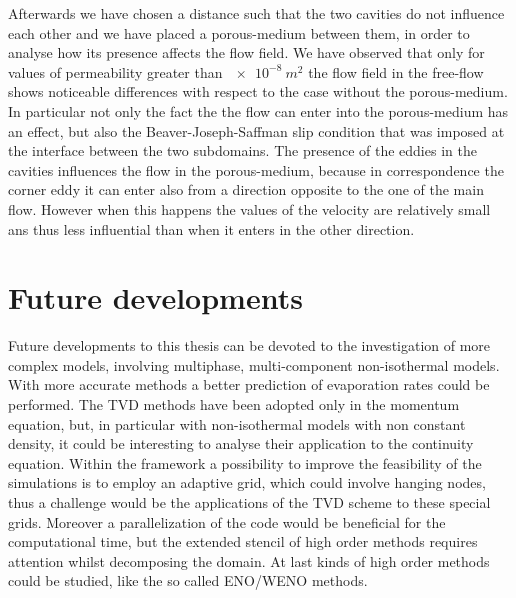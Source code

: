 Afterwards we have chosen a distance such that the two cavities do not 
influence each other and we have placed a porous-medium between them, in order 
to analyse how its presence affects the flow field. We have observed that only 
for values of permeability greater than $\SI{e-8}{m^2}$ the flow field in the 
free-flow shows noticeable differences with respect to the case without the 
porous-medium. In particular not only the fact the the flow can enter into the 
porous-medium has an effect, but also the Beaver-Joseph-Saffman slip condition 
that was imposed at the interface between the two subdomains. The presence of 
the eddies in the cavities influences the flow in the porous-medium, because in 
correspondence the corner eddy it can enter also from a direction opposite to 
the one of the main flow. However when this happens the values of the velocity 
are relatively small ans thus less influential than when it enters in the other 
direction.
\section{Future developments}
Future developments to this thesis can be devoted to the investigation of more 
complex models, involving multiphase, multi-component non-isothermal models. 
With more accurate methods a better prediction of evaporation rates could be 
performed.
The TVD methods have been adopted only in the momentum equation, but, in 
particular with non-isothermal models with non constant density, it could be 
interesting to analyse their application to the continuity equation.
Within the \DUMUX framework a possibility to improve the feasibility of the 
simulations is to employ an adaptive grid, which could involve hanging nodes, 
thus a challenge would be the applications of the TVD scheme to these special 
grids. Moreover a parallelization of the code would be beneficial for the 
computational time, but the extended stencil of high order methods requires 
attention whilst decomposing the domain.
At last kinds of high order methods could be studied, like the so called 
ENO/WENO methods.%

